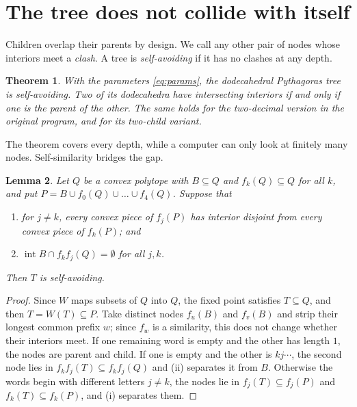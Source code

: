 \documentclass[11pt,a4paper]{article}
\newtheorem{theorem}{Theorem}
\newtheorem{lemma}[theorem]{Lemma}
\theoremstyle{definition}
\theoremstyle{remark}
\newcommand{\inter}{\operatorname{int}}
\begin{document}
\section{The tree does not collide with itself}\label{sec:avoid}

Children overlap their parents by design.  We call any other pair of nodes
whose interiors meet a \emph{clash}.  A tree is \emph{self-avoiding} if it has
no clashes at any depth.

\begin{theorem}\label{thm:avoid}
With the parameters \eqref{eq:params}, the dodecahedral Pythagoras tree is
self-avoiding.  Two of its dodecahedra have intersecting interiors if and only
if one is the parent of the other.  The same holds for the two-decimal version
in the original program, and for its two-child variant.
\end{theorem}

The theorem covers every depth, while a computer can only look at finitely many
nodes.  Self-similarity bridges the gap.

\begin{lemma}\label{lem:reduction}
Let $Q$ be a convex polytope with $B\subseteq Q$ and $f_k(Q)\subseteq Q$ for all
$k$, and put $P=B\cup f_0(Q)\cup\dots\cup f_4(Q)$.  Suppose that
\begin{enumerate}
\item[(i)] for $j\ne k$, every convex piece of $f_j(P)$ has interior disjoint
from every convex piece of $f_k(P)$; and
\item[(ii)] $\inter B\cap f_kf_j(Q)=\emptyset$ for all $j,k$.
\end{enumerate}
Then $T$ is self-avoiding.
\end{lemma}

\begin{proof}
Since $W$ maps subsets of $Q$ into $Q$, the fixed point satisfies $T\subseteq Q$,
and then $T=W(T)\subseteq P$.  Take distinct nodes $f_u(B)$ and $f_v(B)$ and
strip their longest common prefix $w$; since $f_w$ is a similarity, this does
not change whether their interiors meet.  If one remaining word is empty and
the other has length $1$, the nodes are parent and child.  If one is empty and
the other is $kj\cdots$, the second node lies in $f_kf_j(T)\subseteq f_kf_j(Q)$
and (ii) separates it from $B$.  Otherwise the words begin with different
letters $j\neq k$, the nodes lie in $f_j(T)\subseteq f_j(P)$ and
$f_k(T)\subseteq f_k(P)$, and (i) separates them.
\end{proof}
\end{document}
